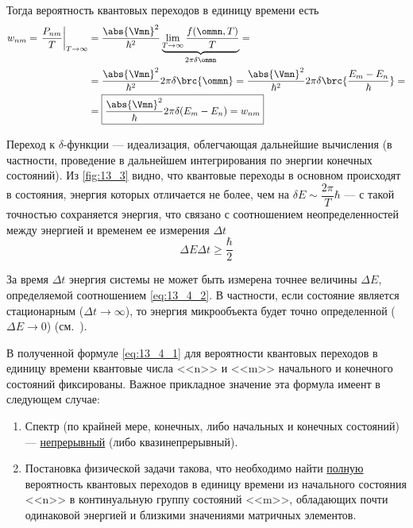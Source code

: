 Тогда вероятность квантовых переходов в единицу времени есть
\begin{align}
w_{nm} = \left . \frac{P_{nm}}{T}\right|_{T \to \infty} 
  & = \frac{\abs{\Vmn}^2}{\hbar^2} \underbrace{\lim_{T \to \infty} \frac{f(\ommn, T)}{T}}_{2\pi\delta{\ommn}} = \nonumber \\
  & = \frac{\abs{\Vmn}^2}{\hbar^2} 2 \pi \delta \brc{\ommn}
  = \frac{\abs{\Vmn}^2}{\hbar^2} 2 \pi \delta \brc{\frac{E_m - E_n}{\hbar}} = \nonumber \\
  \label{eq:13_4_1}
  &= \boxed {
    \frac{\abs{\Vmn}^2}{\hbar} 2 \pi \delta (E_m - E_n) = w_{nm}
  }
\end{align}

Переход к $\delta$-функции --- идеализация, облегчающая дальнейшие вычисления (в частности, проведение в дальнейшем интегрирования по энергии конечных состояний). Из \autoref{fig:13_3} видно, что квантовые переходы в основном происходят в состояния, энергия которых отличается не более, чем на $\delta E \sim \dfrac{2\pi}{T} \hbar$ --- с такой точностью сохраняется энергия, что связано с соотношением неопределенностей между энергией и временем ее измерения $\Delta t$
\begin{equation}
\label{eq:13_4_2}
\boxed{\Delta E \Delta t \ge \frac{\hbar}{2}} 
\end{equation}

За время $\Delta t$ энергия системы не может быть измерена точнее величины $\Delta E$, определяемой соотношением \eqref{eq:13_4_2}. В частности, если состояние является стационарным ($\Delta t \to \infty$), то энергия микрообъекта будет точно определенной ($\Delta E \to 0$) (см.~).

В полученной формуле \eqref{eq:13_4_1} для вероятности квантовых переходов в единицу времени квантовые числа <<n>> и <<m>> начального и конечного состояний фиксированы. Важное прикладное значение эта формула имеент в следующем случае:
\begin{enumerate}
\item Спектр (по крайней мере, конечных, либо начальных и конечных состояний) --- \underline{непрерывный} (либо квазинепрерывный).
\item Постановка физической задачи такова, что необходимо найти \underline{полную} вероятность квантовых переходов в единицу времени из начального состояния <<n>> в континуальную группу состояний <<m>>, обладающих почти одинаковой энергией и близкими значениями матричных элементов.
\end{enumerate}

